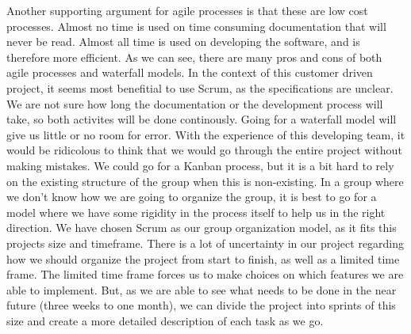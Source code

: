 \newline
\newline
Another supporting argument for agile processes is that these are low cost processes. Almost no time is used on time consuming documentation that will never be read. Almost all time is used on developing the software, and is therefore more efficient. 
\newline
\newline
As we can see, there are many pros and cons of both agile processes and waterfall models. In the context of this customer driven project, it seems most benefitial to use Scrum, as the specifications are unclear. We are not sure how long the documentation or the development process will take, so both activites will be done continously. Going for a waterfall model will give us little or no room for error. With the experience of this developing team, it would be ridicolous to think that we would go through the entire project without making mistakes. 
\newline
\newline
We could go for a Kanban process, but it is a bit hard to rely on the existing structure of the group when this is non-existing. In a group where we don’t know how we are going to organize the group, it is best to go for a model where we have some rigidity in the process itself to help us in the right direction. 
\newline
\newline
We have chosen Scrum as our group organization model, as it fits this projects size and timeframe. There is a lot of uncertainty in our project regarding how we should organize the project from start to finish, as well as a limited time frame. The limited time frame forces us to make choices on which features we are able to implement.  But, as we are able to see what needs to be done in the near future (three weeks to one month), we can divide the project into sprints of this size and create a more detailed description of each task as we go.


